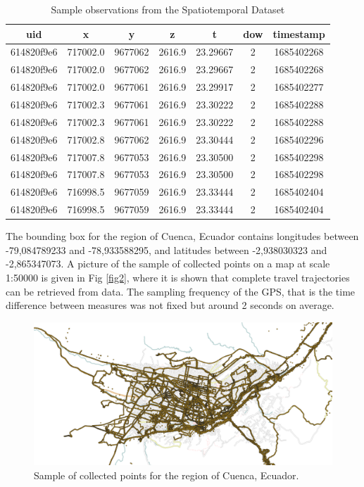 \documentclass[runningheads]{llncs}
\begin{document}
\begin{table}

\caption{\label{tab:load-data}\label{tab1}Sample observations from the Spatiotemporal Dataset}
\centering
\begin{tabular}[t]{c|c|c|c|c|c|c}
\hline
uid & x & y & z & t & dow & timestamp\\
\hline
614820f9e6 & 717002.0 & 9677062 & 2616.9 & 23.29667 & 2 & 1685402268\\
\hline
614820f9e6 & 717002.0 & 9677062 & 2616.9 & 23.29667 & 2 & 1685402268\\
\hline
614820f9e6 & 717002.0 & 9677061 & 2616.9 & 23.29917 & 2 & 1685402277\\
\hline
614820f9e6 & 717002.3 & 9677061 & 2616.9 & 23.30222 & 2 & 1685402288\\
\hline
614820f9e6 & 717002.3 & 9677061 & 2616.9 & 23.30222 & 2 & 1685402288\\
\hline
614820f9e6 & 717002.8 & 9677062 & 2616.9 & 23.30444 & 2 & 1685402296\\
\hline
614820f9e6 & 717007.8 & 9677053 & 2616.9 & 23.30500 & 2 & 1685402298\\
\hline
614820f9e6 & 717007.8 & 9677053 & 2616.9 & 23.30500 & 2 & 1685402298\\
\hline
614820f9e6 & 716998.5 & 9677059 & 2616.9 & 23.33444 & 2 & 1685402404\\
\hline
614820f9e6 & 716998.5 & 9677059 & 2616.9 & 23.33444 & 2 & 1685402404\\
\hline
\end{tabular}
\end{table}

The bounding box for the region of Cuenca, Ecuador contains longitudes between -79,084789233 and -78,933588295, and latitudes between -2,938030323 and -2,865347073. A picture of the sample of collected points on a map at scale 1:50000 is given in Fig \ref{fig2}, where it is shown that complete travel trajectories can be retrieved from data. The sampling frequency of the GPS, that is the time difference between measures was not fixed but around 2 seconds on average.

\begin{figure}

{\centering \includegraphics[width=0.9\linewidth]{paper/images/mapa} 

}

\caption{\label{fig2}Sample of collected points for the region of Cuenca, Ecuador.}\label{fig:unnamed-chunk-2}
\end{figure}
\end{document}
